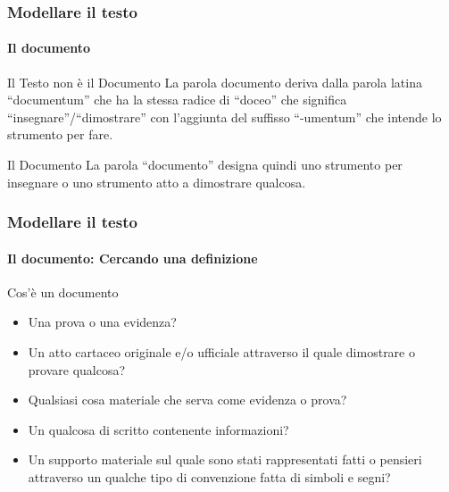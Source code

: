 

\begin{frame}
	\frametitle{Modellare il testo}
	\framesubtitle{Il documento}
	\addtocounter{nframe}{1}

	\begin{block}{Il Testo non è il Documento}
		La parola documento deriva dalla parola latina ``documentum'' che ha la stessa radice di ``doceo'' che significa ``insegnare''/``dimostrare'' con l'aggiunta del suffisso ``-umentum'' che intende lo strumento per fare.
	\end{block}

	\begin{block}{Il Documento}
		La parola ``documento'' designa quindi uno strumento per insegnare o uno strumento atto a dimostrare qualcosa.
	\end{block}


\end{frame}

\begin{frame}
	\frametitle{Modellare il testo}
	\framesubtitle{Il documento: Cercando una definizione}
	\addtocounter{nframe}{1}

	\begin{block}{Cos'è un documento}
		\begin{itemize}
			\item Una prova o una evidenza?
			\item Un atto cartaceo originale e/o ufficiale attraverso il quale dimostrare o provare qualcosa?
			\item Qualsiasi cosa materiale che serva come evidenza o prova?
			\item Un qualcosa di scritto contenente informazioni?
			\item Un supporto materiale sul quale sono stati rappresentati fatti o pensieri attraverso un qualche tipo di convenzione fatta di simboli e segni?
		\end{itemize}

	\end{block}

\end{frame}



